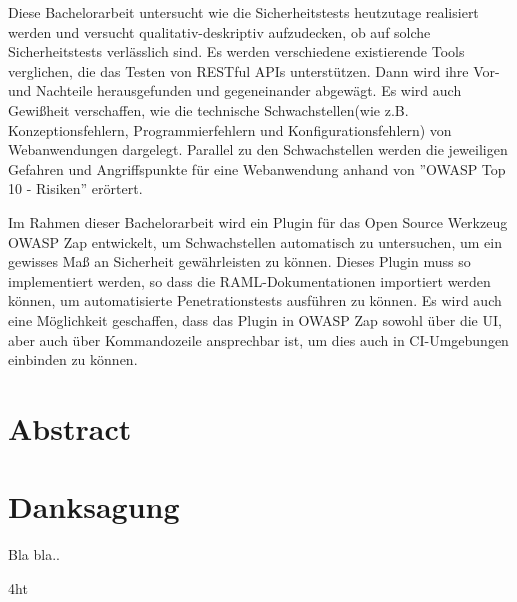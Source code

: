 \documentclass[
               paper=a4,
               twoside,  %
               bibliography=totoc,
               headsepline,
               cleardoublepage=empty,
               parskip=half,
               final
               ]{scrbook}
\begin{document}
Diese Bachelorarbeit untersucht wie die Sicherheitstests heutzutage realisiert werden und versucht qualitativ-deskriptiv aufzudecken, ob auf solche Sicherheitstests verlässlich sind. Es werden verschiedene existierende Tools verglichen, die das Testen von RESTful APIs unterstützen. Dann wird ihre Vor- und Nachteile herausgefunden und gegeneinander abgewägt. Es wird auch Gewißheit verschaffen, wie die technische Schwachstellen(wie z.B. Konzeptionsfehlern, Programmierfehlern und Konfigurationsfehlern) von Webanwendungen dargelegt. Parallel zu den Schwachstellen werden die jeweiligen Gefahren und Angriffspunkte für eine Webanwendung anhand von ''OWASP Top 10 - Risiken'' erörtert.

Im Rahmen dieser Bachelorarbeit wird ein Plugin für das Open Source Werkzeug OWASP Zap entwickelt, um Schwachstellen automatisch zu untersuchen, um ein gewisses Maß an Sicherheit gewährleisten zu können. Dieses Plugin muss so implementiert werden, so dass die RAML-Dokumentationen importiert werden können, um automatisierte Penetrationstests ausführen zu können. Es wird auch eine Möglichkeit geschaffen, dass das Plugin in OWASP Zap sowohl über die UI, aber auch über Kommandozeile ansprechbar ist, um dies auch in CI-Umgebungen einbinden zu können.

\else
\section*{Abstract}
\fi

\cleardoublepage

\section*{Danksagung}
Bla bla..




\cleardoublepage




\iftex4ht
\else
{}
\fi

%
%

%
%
%
\setcounter{secnumdepth}{4}
\setcounter{tocdepth}{2}
\tableofcontents
\end{document}
